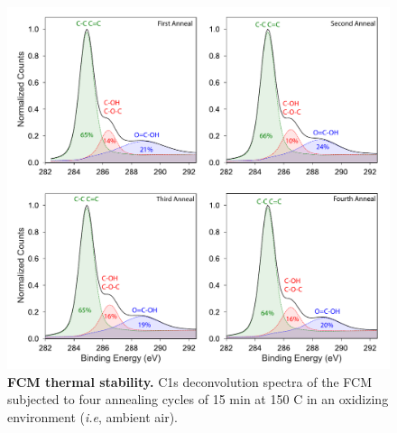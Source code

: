 \begin{figure}[h!]
  \centering
  \includegraphics[width=5in]{paper5/Fig4.pdf}
  \caption{\textbf{FCM thermal stability.} C1s deconvolution spectra of the FCM subjected to four annealing cycles of 15 min at 150 \textdegree C in an oxidizing environment (\textit{i.e}, ambient air).}
  \label{Fig4_pap5}
\end{figure}




